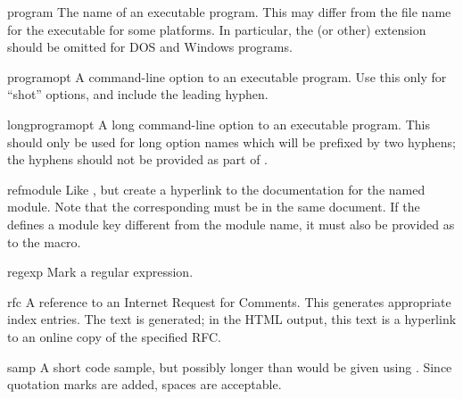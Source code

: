 \documentclass{howto}
\begin{document}
    \begin{macrodesc}{program}{}
      The name of an executable program.  This may differ from the
      file name for the executable for some platforms.  In particular, 
      the  (or other) extension should be omitted for DOS
      and Windows programs.
    \end{macrodesc}

    \begin{macrodesc}{programopt}{}
      A command-line option to an executable program.  Use this only
      for ``shot'' options, and include the leading hyphen.
    \end{macrodesc}

    \begin{macrodesc}{longprogramopt}{}
      A long command-line option to an executable program.  This
      should only be used for long option names which will be prefixed
      by two hyphens; the hyphens should not be provided as part of
      .
    \end{macrodesc}

    \begin{macrodesc}{refmodule}{}
      Like , but create a hyperlink to the documentation 
      for the named module.  Note that the corresponding
       must be in the same document.  If the
       defines a module key different from the
      module name, it must also be provided as  to the
       macro.
    \end{macrodesc}

    \begin{macrodesc}{regexp}{}
      Mark a regular expression.
    \end{macrodesc}

    \begin{macrodesc}{rfc}{}
      A reference to an Internet Request for Comments.  This generates 
      appropriate index entries.  The text  is
      generated; in the HTML output, this text is a hyperlink to an
      online copy of the specified RFC.
    \end{macrodesc}

    \begin{macrodesc}{samp}{}
      A short code sample, but possibly longer than would be given
      using .  Since quotation marks are added, spaces are 
      acceptable.
    \end{macrodesc}
\end{document}
